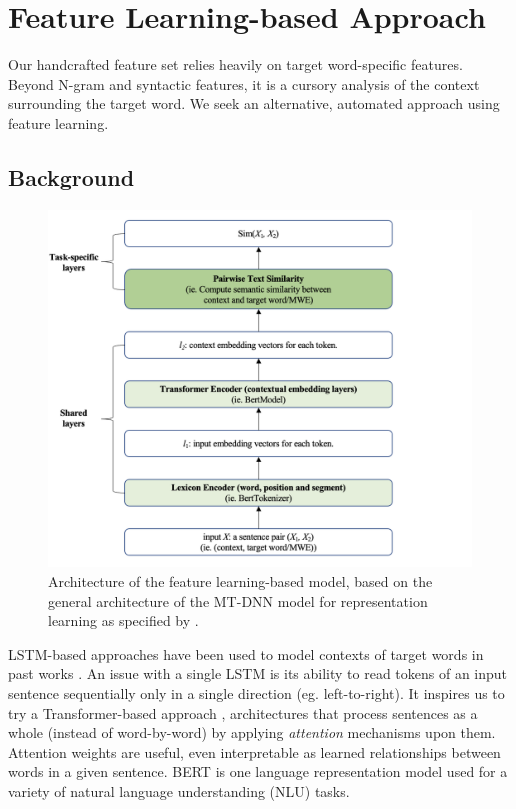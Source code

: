\documentclass{dcthesis}
\theoremstyle{definition}
\theoremstyle{remark}
\begin{document}
\section{Feature Learning-based Approach}

Our handcrafted feature set relies heavily on target word-specific features. Beyond N-gram and syntactic features, it is a cursory analysis of the context surrounding the target word. We seek an alternative, automated approach using feature learning.

\subsection{Background}

\begin{figure}
  \centering
  \includegraphics[scale=0.75]{architecture.png}
  \caption{\label{fig:architecture} Architecture of the feature learning-based model, based on the general architecture of the MT-DNN model for representation learning as specified by \citet{liu2019multi}.}
\end{figure}

LSTM-based approaches have been used to model contexts of target words in past works \citep{hartmann2018nilc, de2018deep}. An issue with a single LSTM is its ability to read tokens of an input sentence sequentially only in a single direction (eg. left-to-right). It inspires us to try a Transformer-based approach \citep{vaswani2017attention}, architectures that process sentences as a whole (instead of word-by-word) by applying \textit{attention} mechanisms upon them. Attention weights are useful, even interpretable as learned relationships between words in a given sentence. BERT \citep{devlin2018bert} is one language representation model used for a variety of natural language understanding (NLU) tasks.
\end{document}

